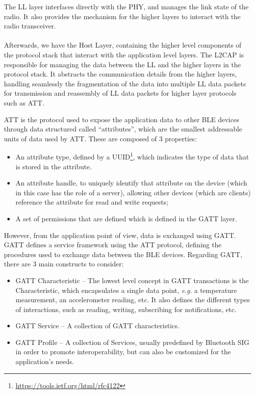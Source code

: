 The \acf{LL} layer interfaces directly with the \acs{PHY}, and manages the link state of the radio. It also provides the mechanism for the higher layers to interact with the radio transceiver. 

\paragraph{} Afterwards, we have the Host Layer, containing the higher level components of the protocol stack that interact with the application level layers. The \acs{L2CAP} is responsible for managing the data between the \acs{LL} and the higher layers in the protocol stack. It abstracts the communication details from the higher layers, handling seamlessly the fragmentation of the data into multiple \acs{LL} data packets for transmission and reassembly of \acs{LL} data packets for higher layer protocols such as \acf{ATT}.

\acs{ATT} is the protocol used to expose the application data to other \acs{BLE} devices through data structured called ``attributes'', which are the smallest addressable units of data used by \acs{ATT}. These are composed of 3 properties: 

\begin{itemize}
    \item An attribute type, defined by a \acf{UUID}\footnote{\url{https://tools.ietf.org/html/rfc4122}}, which indicates the type of data that is stored in the attribute.
    \item An attribute handle, to uniquely identify that attribute on the device (which in this case has the role of a server), allowing other devices (which are clients) reference the attribute for read and write requests;
    \item A set of permissions that are defined which is defined in the \acf{GATT} layer.
\end{itemize}

However, from the application point of view, data is exchanged using \acf{GATT}. \acs{GATT} defines a service framework using the \acs{ATT} protocol, defining the procedures used to exchange data between the \acs{BLE} devices. Regarding \acs{GATT}, there are 3 main constructs to consider:

\begin{itemize}
    \item \acs{GATT} Characteristic -- The lowest level concept in \acs{GATT} transactions is the Characteristic, which encapsulates a single data point, \textit{e.g.} a temperature measurement, an accelerometer reading, etc. It also defines the different types of interactions, such as reading, writing, subscribing for notifications, etc.
    \item \acs{GATT} Service -- A collection of \acs{GATT} characteristics.
    \item \acs{GATT} Profile -- A collection of Services, usually predefined by Bluetooth SIG in order to promote interoperability, but can also be customized for the application's needs.
\end{itemize}

